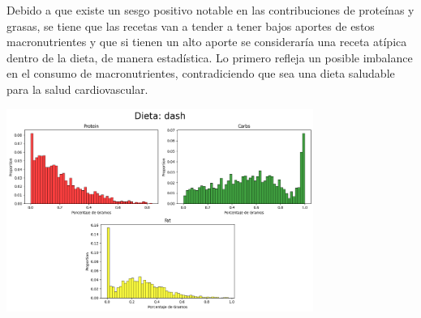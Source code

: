 \documentclass[12pt,a4paper]{article}
\begin{document}
        Debido a que existe un sesgo positivo notable en las contribuciones de 
        proteínas y grasas, se tiene que las recetas van a tender a tener bajos 
        aportes de estos macronutrientes y que si tienen un alto aporte se 
        consideraría una receta atípica dentro de la dieta, de manera estadística. 
        Lo primero refleja un posible imbalance en el consumo de macronutrientes, 
        contradiciendo que sea una dieta saludable para la salud cardiovascular.
        \begin{center}
            \includegraphics[width=0.75\textwidth]{Resources/2_03_plot_01.png}
        \end{center}
\end{document}
